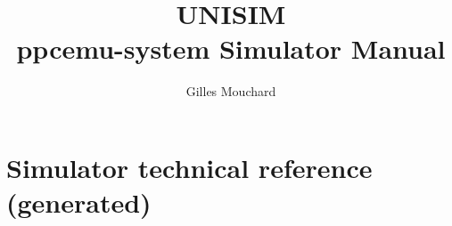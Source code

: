 \documentclass[a4paper,11pt]{article}
\begin{document}
\title{UNISIM\\ ppcemu-system Simulator Manual}
\author{Gilles Mouchard}
\date{}

\maketitle

\section{Simulator technical reference (generated)}

\end{document}
